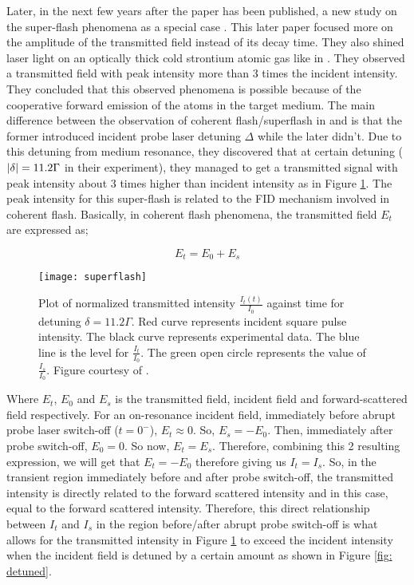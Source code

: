 Later, in the next few years after the paper \cite{Chalony2011} has been published, a new study on the super-flash phenomena as a special case \cite{Kwong2014}. This later paper focused more on the amplitude of the transmitted field instead of its decay time. They also shined laser light on an optically thick cold strontium atomic gas like in \cite{Chalony2011}. They observed a transmitted field with peak intensity more than 3 times the incident intensity. They concluded that this observed phenomena is possible because of the cooperative forward emission of the atoms in the target medium. The main difference between the observation of coherent flash/superflash in \cite{Kwong2014} and \cite{Chalony2011} is that the former introduced incident probe laser detuning $\Delta$ while the later didn't. Due to this detuning from medium resonance, they discovered that at certain detuning ($\abs{\delta} = 11.2 \Gamma$ in their experiment), they managed to get a transmitted signal with peak intensity about 3 times higher than incident intensity as in Figure \ref{fig: superflash}. The peak intensity for this super-flash is related to the FID mechanism involved in coherent flash. Basically, in coherent flash phenomena, the transmitted field $E_{t}$ are expressed as;

\begin{equation}
    E_{t} = E_{0} + E_{s}
\end{equation}

\begin{figure}[h!]
    \centering
    \texttt{[image: superflash]}
    \caption{Plot of normalized transmitted intensity $\frac{I_{t}(t)}{I_{0}}$ against time for detuning $\delta = 11.2\Gamma$. Red curve represents incident square pulse intensity. The black curve represents experimental data. The blue line is the level for $\frac{I_t}{I_0}$. The green open circle represents the value of $\frac{I_{s}}{I_{0}}$. Figure courtesy of \cite{Kwong2014}.}
    \label{fig: superflash}
\end{figure}

Where $E_{t}$, $E_{0}$ and $E_{s}$ is the transmitted field, incident field and forward-scattered field respectively. For an on-resonance incident field, immediately before abrupt probe laser switch-off ($t = 0^{-}$), $E_{t} \approx 0$. So, $E_{s} = - E_{0}$. Then, immediately after probe switch-off, $E_{0} = 0$. So now, $E_{t} = E_{s}$. Therefore, combining this 2 resulting expression, we will get that $E_{t} = - E_{0}$ therefore giving us $I_{t} = I_{s}$. So, in the transient region immediately before and after probe switch-off, the transmitted intensity is directly related to the forward scattered intensity and in this case, equal to the forward scattered intensity. Therefore, this direct relationship between $I_{t}$ and $I_{s}$ in the region before/after abrupt probe switch-off is what allows for the transmitted intensity in Figure \ref{fig: superflash} to exceed the incident intensity when the incident field is detuned by a certain amount as shown in Figure \ref{fig: detuned}. 

